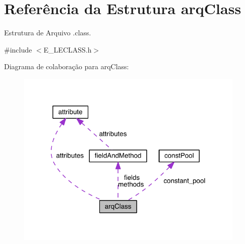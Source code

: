 \hypertarget{structarq_class}{}\section{Referência da Estrutura arq\+Class}
\label{structarq_class}


Estrutura de Arquivo .class.  




{\ttfamily \#include $<$E\+\_\+\+L\+E\+C\+L\+A\+S\+S.\+h$>$}



Diagrama de colaboração para arq\+Class\+:\nopagebreak
\begin{figure}[H]
\begin{center}
\leavevmode
\includegraphics[width=310pt]{structarq_class__coll__graph}
\end{center}
\end{figure}
